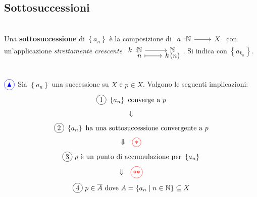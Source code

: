 \subsection{Sottosuccessioni}
\begin{define}[Sottosuccessione.]~{}\\
Una \textbf{sottosuccessione} di $\left\{a_n\right\}$ è la composizione di $\funz{a}{\naturalset}{X}$ con un'applicazione \textit{strettamente crescente} $\funztot{k}{\naturalset}{\naturalset}{n}{k\left(n\right)}$. Si indica con $\left\{a_{k_n}\right\}$.
\end{define}
\begin{lemming}~{}\label{lemmatriangolino}\\
${\textcolor{blue}{\circled{{\large \blacktriangle}}}}$ Sia $\left\{a_n\right\}$ una successione su $X$ e $p\in X$. Valgono le seguenti implicazioni:
	\begin{equation}
		\circled{1}\ \left\{a_n\right\}\text{ converge a }p
	\end{equation}
\begin{equation*}
	\begin{array}{ll}
	\Downarrow
\end{array}
\end{equation*}
\begin{equation}
		\circled{2}\ \left\{a_n\right\}\text{ ha una sottosuccessione convergente a }p
\end{equation}
\begin{equation*}
\begin{array}{ll}
	\Downarrow &  \textcolor{red}{\circled{\ast}}
\end{array}
\end{equation*}
\begin{equation}
	\circled{3}\ p\text{ è un punto di accumulazione per }\left\{a_n\right\}
\end{equation}
	\begin{equation*}
	\begin{array}{ll}
		\Downarrow & \textcolor{red}{\circled{\ast\ast}}
	\end{array}
\end{equation*}
\begin{equation}
	\circled{4}\ p\in\overline{A}\text{ dove }A=\left\{a_n\mid n\in \naturalset\right\}\subseteq X
\end{equation}
\vspace{-6mm}
\end{lemming}
